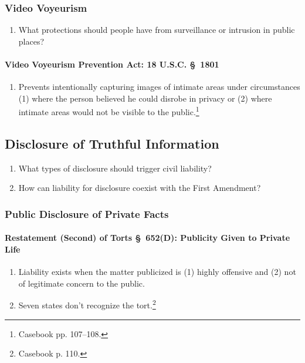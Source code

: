 \subsubsection{Video Voyeurism}

\begin{enumerate}
    \item What protections should people have from surveillance or intrusion in 
    public places?
\end{enumerate}

\paragraph{Video Voyeurism Prevention Act: 18 U.S.C. \S\ 1801}

\begin{enumerate}
    \item Prevents intentionally capturing images of intimate areas under 
    circumstances (1) where the person believed he could disrobe in privacy or 
    (2) where intimate areas would not be visible to the 
    public.\footnote{Casebook pp. 107--108.}
\end{enumerate}

\subsection{Disclosure of Truthful Information}

\begin{enumerate}
    \item What types of disclosure should trigger civil liability?
    \item How can liability for disclosure coexist with the First Amendment?
\end{enumerate}

\subsubsection{Public Disclosure of Private Facts}

\paragraph{Restatement (Second) of Torts \S\ 652(D): Publicity Given to Private 
Life}

\begin{enumerate}
    \item Liability exists when the matter publicized is (1) highly offensive 
    and (2) not of legitimate concern to the public.
    \item Seven states don't recognize the tort.\footnote{Casebook p. 110.}
\end{enumerate}

